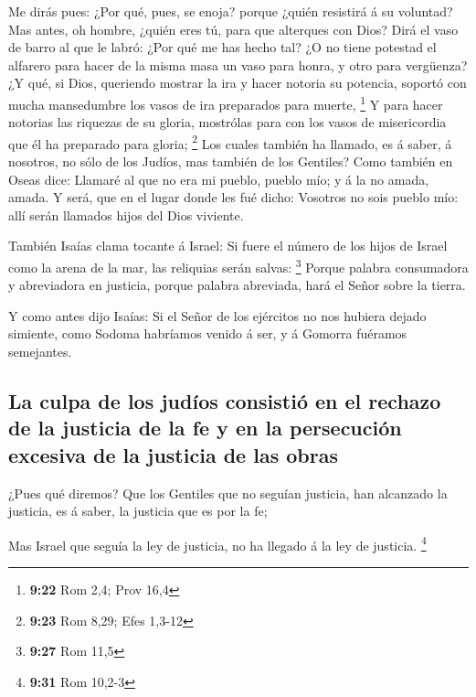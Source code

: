  Me dirás pues: ¿Por qué, pues, se enoja? porque ¿quién
resistirá á su voluntad?  Mas antes, oh hombre, ¿quién eres
tú, para que alterques con Dios? Dirá el vaso de barro al que le labró:
¿Por qué me has hecho tal?  ¿O no tiene potestad el
alfarero para hacer de la misma masa un vaso para honra, y otro para
vergüenza?  ¿Y qué, si Dios, queriendo mostrar la ira y
hacer notoria su potencia, soportó con mucha mansedumbre los vasos de
ira preparados para muerte, \footnote{\textbf{9:22} Rom 2,4; Prov 16,4}
 Y para hacer notorias las riquezas de su gloria, mostrólas
para con los vasos de misericordia que él ha preparado para gloria;
\footnote{\textbf{9:23} Rom 8,29; Efes 1,3-12}  Los cuales
también ha llamado, es á saber, á nosotros, no sólo de los Judíos, mas
también de los Gentiles?  Como también en Oseas dice:
Llamaré al que no era mi pueblo, pueblo mío; y á la no amada, amada.
 Y será, que en el lugar donde les fué dicho: Vosotros no
sois pueblo mío: allí serán llamados hijos del Dios viviente.

 También Isaías clama tocante á Israel: Si fuere el número
de los hijos de Israel como la arena de la mar, las reliquias serán
salvas: \footnote{\textbf{9:27} Rom 11,5}  Porque palabra
consumadora y abreviadora en justicia, porque palabra abreviada, hará el
Señor sobre la tierra.

 Y como antes dijo Isaías: Si el Señor de los ejércitos no
nos hubiera dejado simiente, como Sodoma habríamos venido á ser, y á
Gomorra fuéramos semejantes.

\hypertarget{la-culpa-de-los-juduxedos-consistiuxf3-en-el-rechazo-de-la-justicia-de-la-fe-y-en-la-persecuciuxf3n-excesiva-de-la-justicia-de-las-obras}{%
\subsection{La culpa de los judíos consistió en el rechazo de la
justicia de la fe y en la persecución excesiva de la justicia de las
obras}\label{la-culpa-de-los-juduxedos-consistiuxf3-en-el-rechazo-de-la-justicia-de-la-fe-y-en-la-persecuciuxf3n-excesiva-de-la-justicia-de-las-obras}}

 ¿Pues qué diremos? Que los Gentiles que no seguían
justicia, han alcanzado la justicia, es á saber, la justicia que es por
la fe;

 Mas Israel que seguía la ley de justicia, no ha llegado á
la ley de justicia. \footnote{\textbf{9:31} Rom 10,2-3}

